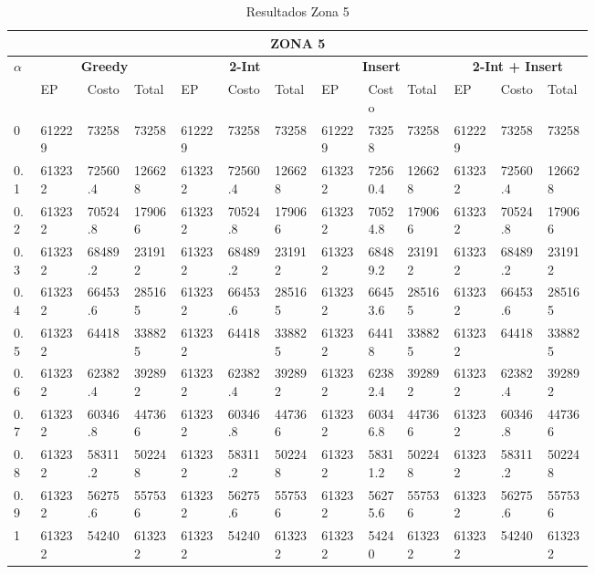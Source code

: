 \documentclass[conference]{IEEEtran}
\begin{document}
\begin{table*}[t]
\caption{Resultados Zona 5}
\centering
\begin{tabular}{|p{0.03\linewidth}|p{0.06\linewidth}|p{0.06\linewidth}|p{0.06\linewidth}|p{0.06\linewidth}|p{0.06\linewidth}|p{0.06\linewidth}|p{0.06\linewidth}|p{0.05\linewidth}|p{0.06\linewidth}|p{0.06\linewidth}|p{0.06\linewidth}|p{0.06\linewidth}|}
\hline
\multicolumn{13}{|c|}{\textbf{ZONA 5}} \\ 
\hline

\multirow{2}{*}{\textbf{$\alpha$}}  & \multicolumn{3}{|c|}{\textbf{Greedy}} & \multicolumn{3}{|c|}{\textbf{2-Int}} & \multicolumn{3}{|c|}{\textbf{Insert}} & \multicolumn{3}{|c|}{\textbf{2-Int + Insert}} \\

\cline{2-13}
& EP & Costo & Total & EP & Costo & Total & EP & Costo & Total & EP & Costo & Total  \\
\hline
0 & 612229 & 73258 & 73258 & 612229 & 73258 & 73258 & 612229 & 73258 & 73258 & 612229 & 73258 & 73258  \\
\hline

0.1 & 613232 & 72560.4 & 126628 & 613232 & 72560.4 & 126628 & 613232 & 72560.4 & 126628 & 613232 & 72560.4 & 126628  \\
\hline

0.2 & 613232 & 70524.8 & 179066 & 613232 & 70524.8 & 179066 & 613232 & 70524.8 & 179066 & 613232 & 70524.8 & 179066  \\
\hline

0.3 & 613232 & 68489.2 & 231912 & 613232 & 68489.2 & 231912 & 613232 & 68489.2 & 231912 & 613232 & 68489.2 & 231912  \\
\hline

0.4 & 613232 & 66453.6 & 285165 & 613232 & 66453.6 & 285165 & 613232 & 66453.6 & 285165 & 613232 & 66453.6 & 285165  \\
\hline

0.5 & 613232 & 64418 & 338825 & 613232 & 64418 & 338825 & 613232 & 64418 & 338825 & 613232 & 64418 & 338825  \\
\hline

0.6 & 613232 & 62382.4 & 392892 & 613232 & 62382.4 & 392892 & 613232 & 62382.4 & 392892 & 613232 & 62382.4 & 392892  \\
\hline

0.7 & 613232 & 60346.8 & 447366 & 613232 & 60346.8 & 447366 & 613232 & 60346.8 & 447366 & 613232 & 60346.8 & 447366  \\
\hline

0.8 & 613232 & 58311.2 & 502248 & 613232 & 58311.2 & 502248 & 613232 & 58311.2 & 502248 & 613232 & 58311.2 & 502248  \\
\hline

0.9 & 613232 & 56275.6 & 557536 & 613232 & 56275.6 & 557536 & 613232 & 56275.6 & 557536 & 613232 & 56275.6 & 557536  \\
\hline

1 & 613232 & 54240 & 613232 & 613232 & 54240 & 613232 & 613232 & 54240 & 613232 & 613232 & 54240 & 613232  \\
\hline
\end{tabular}
\end{table*}
\end{document}
